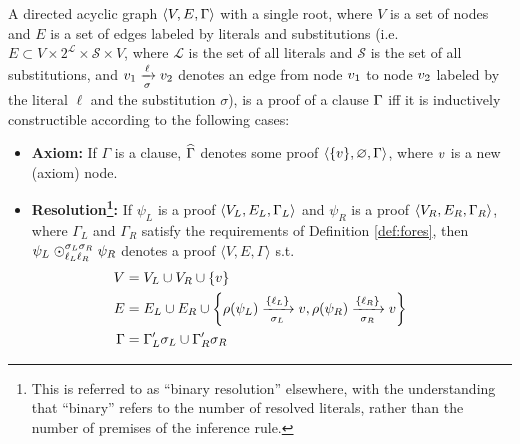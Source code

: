 \begin{definition} 
\label{def:proof}%
A directed acyclic graph $\langle V, E, \clause \rangle$ with a single root, where $V$ is a set of nodes and $E$ is a
set of edges labeled by literals and substitutions (i.e. $E \subset V \times 2^{\mathcal{L}} \times \mathcal{S} \times V$, where $\mathcal{L}$ is the set of all literals and $\mathcal{S}$ is the set of all substitutions, and $\n_1
\xrightarrow[\sigma]{\ell} \n_2$ denotes an edge from node $\n_1$ to node $\n_2$ labeled by the literal $\ell$ and the substitution $\sigma$), is a
proof of a clause $\clause$ iff it is inductively constructible according to the following cases:
%
\begin{itemize}
  \item \textbf{Axiom:} If $\Gamma$ is a clause, $\axiom{\Gamma}$ denotes some proof $\langle \{ \n \}, \varnothing,
    \Gamma \rangle$, where $\n$ is a new (axiom) node.
  \item \textbf{Resolution\footnote{This is referred to as ``binary resolution'' elsewhere, with the understanding that ``binary'' refers to the number of resolved literals, rather than the number of premises of the inference rule.}:} If $\psi_L$ is a proof $\langle V_L, E_L, \clause_L \rangle$ and
    $\psi_R$ is a proof $\langle V_R, E_R, \clause_R \rangle$, where $\Gamma_L$ and $\Gamma_R$ satisfy the requirements of Definition \ref{def:fores},
    then
    $\psi_L \res{\ell_L}{\sigma_L}{\ell_R}{\sigma_R} \psi_R$ denotes a proof $\langle V, E, \Gamma \rangle$ s.t.
    \begin{align*}
     \hspace{-0.6cm} V &= V_L \cup V_R \cup \{\n \}    \\
      \hspace{-0.6cm} E &= E_L \cup E_R \cup 
                    \left\{ \raiz{\psi_L} \xrightarrow[\sigma_L]{\{\ell_L\} } \n, 
                            \raiz{\psi_R} \xrightarrow[\sigma_R]{\{\ell_R\} } \n \right\}    \\
    \hspace{-0.6cm}  \Gamma &= \clause_L' \sigma_L \cup  \clause_R' \sigma_R
    \end{align*}

\end{itemize}
\end{definition}

